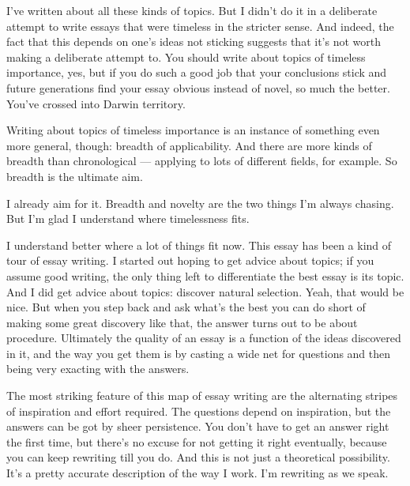 I've written about all these
                  kinds of topics. But I didn't do it in a deliberate attempt to
                  write essays that were timeless in the stricter sense. And
                  indeed, the fact that this depends on one's ideas not sticking
                  suggests that it's not worth making a deliberate attempt to.
                  You should write about topics of timeless importance, yes, but
                  if you do such a good job that your conclusions stick and
                  future generations find your essay obvious instead of novel,
                  so much the better. You've crossed into Darwin territory.

Writing
                  about topics of timeless importance is an instance of
                  something even more general, though: breadth of applicability.
                  And there are more kinds of breadth than chronological ---
                  applying to lots of different fields, for example. So breadth
                  is the ultimate aim.

I already aim for it. Breadth
                  and novelty are the two things I'm always chasing. But I'm
                  glad I understand where timelessness fits.

I
                  understand better where a lot of things fit now. This essay
                  has been a kind of tour of essay writing. I started out hoping
                  to get advice about topics; if you assume good writing, the
                  only thing left to differentiate the best essay is its topic.
                  And I did get advice about topics: discover natural selection.
                  Yeah, that would be nice. But when you step back and ask
                  what's the best you can do short of making some great
                  discovery like that, the answer turns out to be about
                  procedure. Ultimately the quality of an essay is a function of
                  the ideas discovered in it, and the way you get them is by
                  casting a wide net for questions and then being very exacting
                  with the answers.

The most striking feature of this
                  map of essay writing are the alternating stripes of
                  inspiration and effort required. The questions depend on
                  inspiration, but the answers can be got by sheer persistence.
                  You don't have to get an answer right the first time, but
                  there's no excuse for not getting it right eventually, because
                  you can keep rewriting till you do. And this is not just a
                  theoretical possibility. It's a pretty accurate description of
                  the way I work. I'm rewriting as we speak.

